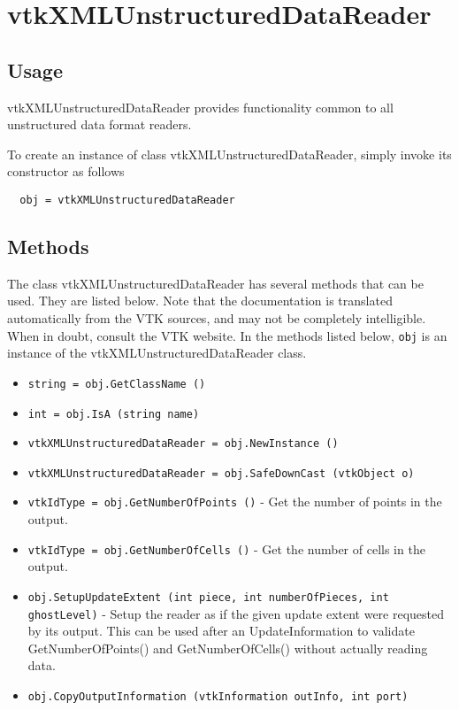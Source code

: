 \section{vtkXMLUnstructuredDataReader}

\subsection{Usage}

 vtkXMLUnstructuredDataReader provides functionality common to all
 unstructured data format readers.

To create an instance of class vtkXMLUnstructuredDataReader, simply
invoke its constructor as follows
\begin{verbatim}
  obj = vtkXMLUnstructuredDataReader
\end{verbatim}
\subsection{Methods}

The class vtkXMLUnstructuredDataReader has several methods that can be used.
  They are listed below.
Note that the documentation is translated automatically from the VTK sources,
and may not be completely intelligible.  When in doubt, consult the VTK website.
In the methods listed below, \verb|obj| is an instance of the vtkXMLUnstructuredDataReader class.
\begin{itemize}
\item  \verb|string = obj.GetClassName ()|

\item  \verb|int = obj.IsA (string name)|

\item  \verb|vtkXMLUnstructuredDataReader = obj.NewInstance ()|

\item  \verb|vtkXMLUnstructuredDataReader = obj.SafeDownCast (vtkObject o)|

\item  \verb|vtkIdType = obj.GetNumberOfPoints ()| -  Get the number of points in the output.

\item  \verb|vtkIdType = obj.GetNumberOfCells ()| -  Get the number of cells in the output.

\item  \verb|obj.SetupUpdateExtent (int piece, int numberOfPieces, int ghostLevel)| -  Setup the reader as if the given update extent were requested by
 its output.  This can be used after an UpdateInformation to
 validate GetNumberOfPoints() and GetNumberOfCells() without
 actually reading data.

\item  \verb|obj.CopyOutputInformation (vtkInformation outInfo, int port)|

\end{itemize}
